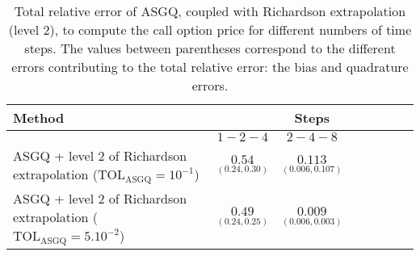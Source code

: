 %		
%		
%		
%		





\begin{table}[!h]
	\begin{small}
		\centering
		\begin{tabular}{l*{6}{c}r}
			\toprule[1.5pt]
			Method & & Steps  & &     \\
			\hline
			& $1-2-4$ & $2-4-8$  \\
			\hline
			
			ASGQ + level $2$ of  Richardson extrapolation ($\text{TOL}_{\text{ASGQ}}=10^{-1}$)  & $\underset{(0.24,0.30)}{\mathbf{ 0.54
			}}$ & $\underset{(0.006,0.107)}{\mathbf{ 0.113}}$ \\
			ASGQ + level $2$ of  Richardson extrapolation ($\text{TOL}_{\text{ASGQ}}=5.10^{-2}$)  & $\underset{(0.24,0.25)}{\mathbf{   0.49
			}}$ & $\underset{(0.006,0.003)}{\mathbf{ 0.009} }$  \\
			\bottomrule[1.25pt]
		\end{tabular}
		\caption{Total relative error of ASGQ, coupled with Richardson extrapolation (level $2$), to compute the call option price for different numbers of time steps.  The values between parentheses correspond to the different errors contributing to the total relative error: the bias and quadrature errors.}
		\label{Total  error of MISC and MC to compute Call option price of the different tolerances for different number of time steps. Case set $2$ parameters, with Richardson extrapolation(level $2$). The numbers between parentheses are the corresponding absolute errors,linear}
	\end{small}
\end{table}
\FloatBarrier

